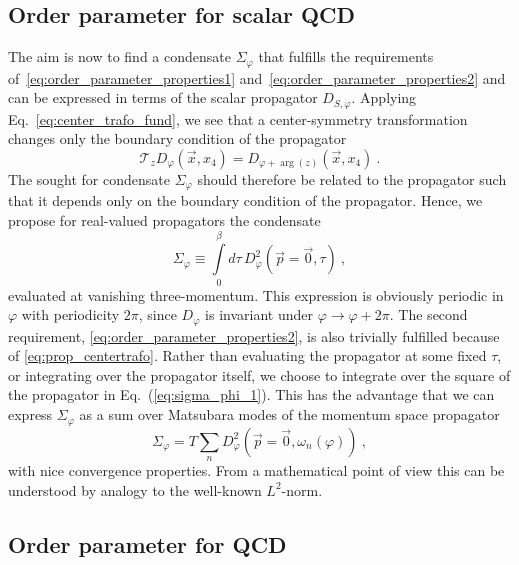 \documentclass[final,twocolumn,merge,sort&compress]{elsarticle}
\def\Eq#1{Eq.~(\ref{#1})}
\begin{document}
\subsection{Order parameter for scalar QCD}
\label{sec:application_sQCD}

The aim is now to find a condensate $\Sigma_\varphi$ that fulfills the
requirements of~\eqref{eq:order_parameter_properties1}
and~\eqref{eq:order_parameter_properties2} and can be expressed in
terms of the scalar propagator $D_{S,\varphi}$.  Applying
Eq.~\eqref{eq:center_trafo_fund}, we see that a center-symmetry
transformation changes only the boundary condition of the propagator
\begin{equation}
\label{eq:prop_centertrafo}
\mathcal T_z  D_{\varphi}(\vec{x},x_4) = D_{\varphi+\arg(z)}(\vec{x},x_4) \ .
\end{equation}
The sought for condensate $\Sigma_\varphi$ should therefore be related
to the propagator such that it depends only on the boundary condition
of the propagator.  Hence, we propose for real-valued propagators the
condensate
\begin{equation}
\label{eq:sigma_phi_1}
\Sigma_\varphi  \equiv \int\limits_{0}^\beta d\tau\, D^2_{\varphi} (\vec p=\vec 0, \tau) \ , 
\end{equation}
evaluated at vanishing three-momentum. This expression is obviously
periodic in $\varphi$ with periodicity $2\pi$, since $D_{\varphi}$ is
invariant under $\varphi \to \varphi+2\pi$.  The second requirement,
\eqref{eq:order_parameter_properties2}, is also trivially fulfilled
because of \eqref{eq:prop_centertrafo}.  Rather than evaluating the
propagator at some fixed $\tau$, or integrating over the propagator
itself, we choose to integrate over the square of the propagator in
\Eq{eq:sigma_phi_1}. This has the advantage that we can express
$\Sigma_\varphi$ as a sum over Matsubara modes of the momentum space
propagator
\begin{equation}
\label{eq:sigma_phi_2}
\Sigma_\varphi = T\sum\limits_{n} D^2_{\varphi} (\vec{p}=\vec 0, \omega_n(  \varphi )) \ ,
\end{equation}
with nice convergence properties.  From a mathematical point of view
this can be understood by analogy to the well-known $L^2$-norm.



\subsection{Order parameter for QCD}
\label{sec:application_QCD}
\end{document}
